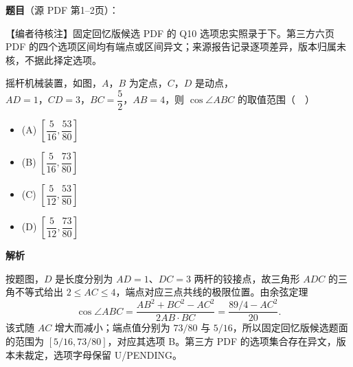 \begin{answer}

\textbf{题目}（源 PDF 第1–2页）：

\begin{gktip}
【编者待核注】固定回忆版候选 PDF 的 Q10 选项忠实照录于下。第三方六页 PDF 的四个选项区间均有端点或区间异文；来源报告记录逐项差异，版本归属未核，不据此择定选项。
\end{gktip}

摇杆机械装置，如图，\(A\text{，}B\) 为定点，\(C\text{，}D\) 是动点，\(AD=1\text{，}CD=3\text{，}BC=\dfrac{5}{2}\text{，}AB=4\)，则 \(\cos\angle ABC\) 的取值范围（　）
\nopagebreak[4]
\begin{center}\end{center}
\nopagebreak[4]
\begin{itemize}
\item (A) \(\left[\dfrac{5}{16},\dfrac{53}{80}\right]\)
\item (B) \(\left[\dfrac{5}{16},\dfrac{73}{80}\right]\)
\item (C) \(\left[\dfrac{5}{12},\dfrac{53}{80}\right]\)
\item (D) \(\left[\dfrac{5}{12},\dfrac{73}{80}\right]\)
\end{itemize}

\textbf{解析}

按题图，\(D\) 是长度分别为 \(AD=1\)、\(DC=3\) 两杆的铰接点，故三角形 \(ADC\) 的三角不等式给出 \(2\le AC\le4\)，端点对应三点共线的极限位置。由余弦定理
\nopagebreak[4]
\[
\cos\angle ABC
=\frac{AB^2+BC^2-AC^2}{2AB\cdot BC}
=\frac{89/4-AC^2}{20}.
\]
该式随 \(AC\) 增大而减小；端点值分别为 \(73/80\) 与 \(5/16\)，所以固定回忆版候选题面的范围为 \([5/16,73/80]\)，对应其选项 B。第三方 PDF 的选项集合存在异文，版本未裁定，选项字母保留 U/PENDING。


\end{answer}

